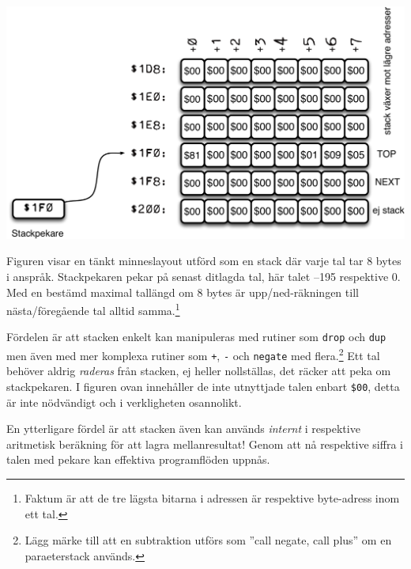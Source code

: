 \documentclass[oneside,10pt,a4paper,swedish]{scrbook}
\newcommand{\asm}[1]{\texttt{#1}}
\begin{document}
\begin{center}
\includegraphics[scale = 0.5]{psp.pdf}
\end{center}

Figuren visar en tänkt minneslayout utförd som en stack där varje tal tar 8 bytes i anspråk. Stackpekaren pekar på  senast ditlagda tal, här talet --195 respektive 0. Med en bestämd maximal tallängd om 8 bytes är upp/ned-räkningen till nästa/föregående tal alltid samma.\footnote{Faktum är att de tre lägsta bitarna i adressen är respektive byte-adress inom ett tal.} 

Fördelen är att stacken enkelt kan manipuleras med rutiner som \asm{drop} och \asm{dup} men även med mer komplexa rutiner som \asm{+}, \asm{-} och \asm{negate} med flera.\footnote{Lägg märke till att en subtraktion utförs som ''call negate, call plus'' om en paraeterstack används.} Ett tal behöver aldrig \emph{raderas} från stacken, ej heller nollställas, det räcker att peka om stackpekaren. I figuren ovan innehåller de inte utnyttjade talen enbart \asm{\$00}, detta är inte nödvändigt och i verkligheten osannolikt.

En ytterligare fördel är att stacken även kan används \emph{internt} i respektive aritmetisk beräkning för att lagra mellanresultat! Genom att nå respektive siffra i talen med pekare kan effektiva programflöden uppnås.

\appendix
\end{document}
